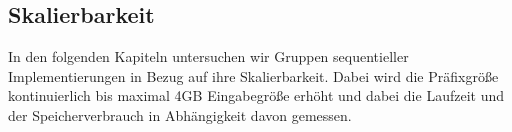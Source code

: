 \subsection{Skalierbarkeit}

In den folgenden Kapiteln untersuchen wir Gruppen sequentieller Implementierungen in Bezug auf ihre Skalierbarkeit. Dabei wird die Präfixgröße kontinuierlich bis maximal 4GB Eingabegröße erhöht und dabei die Laufzeit und der Speicherverbrauch in Abhängigkeit davon gemessen.










%
%
